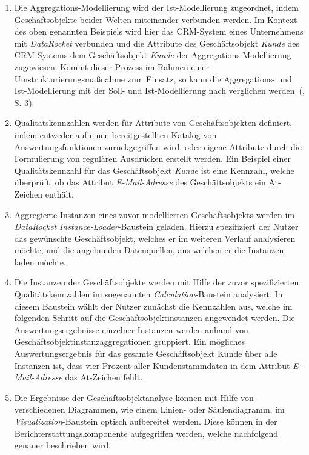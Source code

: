 \documentclass[
  language=german, %
  type=bachelor,%
  ngerman
]{isthesis}
\begin{document}
\begin{content}
\begin{enumerate}
		\item Die Aggregations-Modellierung wird der Ist-Modellierung zugeordnet,
		indem Geschäftsobjekte beider Welten miteinander verbunden werden. Im
		Kontext des oben genannten Beispiels wird hier das \acrshort{CRM}-System
		eines Unternehmens mit \textit{DataRocket} verbunden und die Attribute des
		Geschäftsobjekt \textit{Kunde} des \acrshort{CRM}-Systems dem
		Geschäftsobjekt \textit{Kunde} der Aggregations-Modellierung zugewiesen.
		Kommt dieser Prozess \zB{} im Rahmen einer Umstrukturierungsmaßnahme
		zum Einsatz, so kann die Aggregations- und Ist-Modellierung mit der Soll-
		und Ist-Modellierung nach \textsc{\citeauthor{becker2006konzeptionelle}}
		verglichen werden~(\citeyear{becker2006konzeptionelle}, S. 3).

		\item Qualitätskennzahlen werden für Attribute von Geschäftsobjekten
		definiert, indem entweder auf einen bereitgestellten Katalog von
		Auswertungsfunktionen zurückgegriffen wird, oder eigene Attribute durch die
		Formulierung von regulären Ausdrücken erstellt werden. Ein Beispiel einer
		Qualitätskennzahl für das Geschäftsobjekt \textit{Kunde} ist eine Kennzahl,
		welche überprüft, ob das Attribut \textit{E-Mail-Adresse} des
		Geschäftsobjekts ein At-Zeichen enthält.

		\item Aggregierte Instanzen eines zuvor modellierten Geschäftsobjekts
		werden im \textit{DataRocket} \textit{Instance-Loader}-Baustein geladen.
		Hierzu spezifiziert der Nutzer das gewünschte Geschäftsobjekt, welches er
		im weiteren Verlauf analysieren möchte, und die angebunden Datenquellen,
		aus welchen er die Instanzen laden möchte.

		\item Die Instanzen der Geschäftsobjekte werden mit Hilfe der zuvor
		spezifizierten Qualitätskennzahlen im sogenannten
		\textit{Calculation}-Baustein analysiert. In diesem Baustein wählt der
		Nutzer zunächst die Kennzahlen aus, welche im folgenden Schritt auf die
		Geschäftsobjektinstanzen angewendet werden. Die Auswertungsergebnisse
		einzelner Instanzen werden anhand von Geschäftsobjektinstanzaggregationen
		gruppiert. Ein mögliches Auswertungsergebnis für das gesamte
		Geschäftsobjekt Kunde über alle Instanzen ist, dass vier Prozent aller
		Kundenstammdaten in dem Attribut \textit{E-Mail-Adresse} das At-Zeichen
		fehlt.

		\item Die Ergebnisse der Geschäftsobjektanalyse können mit Hilfe von
		verschiedenen Diagrammen, wie \zB{} einem Linien- oder Säulendiagramm, im
		\textit{Visualization}-Baustein optisch aufbereitet werden. Diese können in
		der Berichterstattungskomponente aufgegriffen werden, welche nachfolgend
		genauer beschrieben wird.


\end{enumerate}
\end{content}
\end{document}

